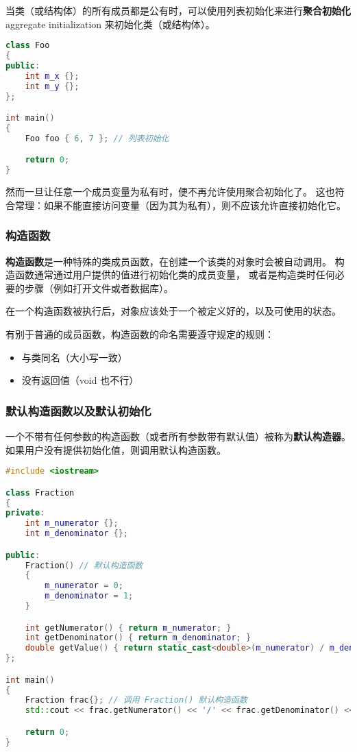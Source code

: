 \documentclass[../../LearnCpp.tex]{subfiles}
\begin{document}

当类（或结构体）的所有成员都是公有时，可以使用列表初始化来进行\textbf{聚合初始化} aggregate initialization 来初始化类（或结构体）。

\begin{lstlisting}[language=C++]
class Foo
{
public:
    int m_x {};
    int m_y {};
};

int main()
{
    Foo foo { 6, 7 }; // 列表初始化

    return 0;
}
\end{lstlisting}

然而一旦让任意一个成员变量为私有时，便不再允许使用聚合初始化了。
这也符合常理：如果不能直接访问变量（因为其为私有），则不应该允许直接初始化它。

\subsubsection*{构造函数}

\textbf{构造函数}是一种特殊的类成员函数，在创建一个该类的对象时会被自动调用。
构造函数通常通过用户提供的值进行初始化类的成员变量，
或者是构造类时任何必要的步骤（例如打开文件或者数据库）。

在一个构造函数被执行后，对象应该处于一个被定义好的，以及可使用的状态。

有别于普通的成员函数，构造函数的命名需要遵守规定的规则：

\begin{itemize}
    \item 与类同名（大小写一致）
    \item 没有返回值（void 也不行）
\end{itemize}

\subsubsection*{默认构造函数以及默认初始化}

一个不带有任何参数的构造函数（或者所有参数带有默认值）被称为\textbf{默认构造器}。
如果用户没有提供初始化值，则调用默认构造函数。

\begin{lstlisting}[language=C++]
#include <iostream>

class Fraction
{
private:
    int m_numerator {};
    int m_denominator {};

public:
    Fraction() // 默认构造函数
    {
        m_numerator = 0;
        m_denominator = 1;
    }

    int getNumerator() { return m_numerator; }
    int getDenominator() { return m_denominator; }
    double getValue() { return static_cast<double>(m_numerator) / m_denominator; }
};

int main()
{
    Fraction frac{}; // 调用 Fraction() 默认构造函数
    std::cout << frac.getNumerator() << '/' << frac.getDenominator() << '\n';

    return 0;
}
\end{lstlisting}
\end{document}
